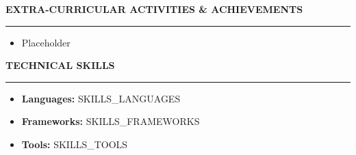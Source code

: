\documentclass[9pt]{article}
\newcommand{\resheading}[1]{\vspace{3pt} \noindent \textbf{\small\scshape{#1}} \vspace{1pt} \hrule \vspace{2pt}}
\begin{document}
\resheading{EXTRA-CURRICULAR ACTIVITIES \& ACHIEVEMENTS}
\begin{itemize}
\item Placeholder
\end{itemize}

\resheading{TECHNICAL SKILLS}
\begin{itemize}
\item \textbf{Languages:} {{SKILLS_LANGUAGES}}
\item \textbf{Frameworks:} {{SKILLS_FRAMEWORKS}}
\item \textbf{Tools:} {{SKILLS_TOOLS}}
\end{itemize}
\end{document}

